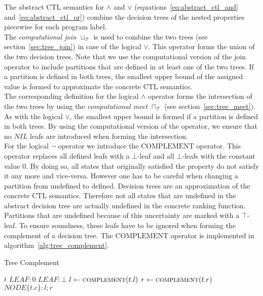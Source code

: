 \documentclass[11pt,a4paper,titlepage]{article}
\begin{document}
The abstract CTL semantics for $\land$ and $\lor$ (equations~\ref{eq:abstract_ctl_and} and~\ref{eq:abstract_ctl_or}) combine the decision trees
of the nested properties piecewise for each program label.\\

The \textit{computational join} $\sqcup_{\mathcal{T}}$ is used to combine the two trees (see section~\ref{sec:tree_join}) in
case of the logical $\lor$. This operator forms the union of the two decision trees. 
Note that we use the computational version of the join operator to include partitions that are defined in at least one of the two trees. 
If a partition is defined in both trees, the smallest upper bound of the assigned value is formed to approximate the concrete CTL semantics.\\

The corresponding definition for the logical $\land$ operator forms the intersection of the two trees by using the
\textit{computational meet} $\sqcap_{\mathcal{T}}$ (see section~\ref{sec:tree_meet}). 
As with the logical $\lor$, the smallest upper bound is formed if a partition is defined in both trees. 
By using the computational version of the operator, 
we ensure that no $NIL$ leafs are introduced when forming the intersection.\\

For the logical $\neg$ operator we introduce the $\text{COMPLEMENT}$ operator. 
This operator replaces all defined leafs with a $\bot$-leaf and all $\bot$-leafs with the constant value $0$.
By doing so, all states that originally satisfied the property do not satisfy it any more and vice-versa.
However one has to be careful when changing a partition from undefined to defined. Decision trees are an 
approximation of the concrete CTL semantics. Therefore not all states that are undefined in the abstract decision tree
are actually undefined in the concrete ranking function. Partitions that are undefined because of this uncertainty are marked with a 
$\top$-leaf. To ensure soundness, these leafs have to be ignored when forming the complement of a decision tree.   
The $\text{COMPLEMENT}$ operator is implemented in algorithm~\ref{alg:tree_complement}.

\begin{algorithm}                      
    \caption{Tree Complement}         
    \label{alg:tree_complement}       
    \begin{algorithmic}
            \State \Return $t$
            \State \Return $LEAF: 0$
            \State \Return $LEAF: \bot$
        \Else
            \State $l \gets \Call{complement}{t.l}$
            \State $r \gets \Call{complement}{t.r}$
            \State \Return $NODE\{t.c \}: l ; r$
        \EndIf
        \EndFunction
\end{algorithmic}
\end{algorithm}
\end{document}
